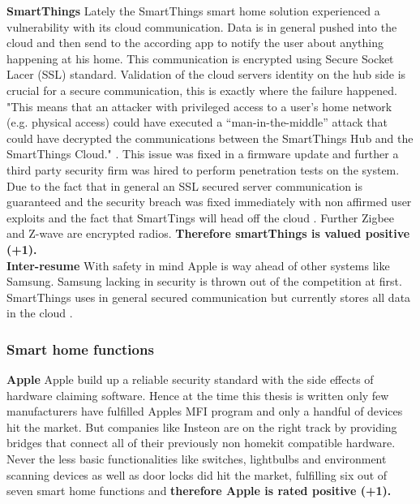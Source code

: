 			\textbf{SmartThings}
				Lately the SmartThings smart home solution experienced a vulnerability with its cloud communication. Data is in general pushed into the cloud and then send to the according app to notify the user about anything happening at his home. This communication is encrypted using Secure Socket Lacer (SSL) standard. Validation of the cloud servers identity on the hub side is crucial for a secure communication, this is exactly where the failure happened. "This means that an attacker with privileged access to a user’s home network (e.g. physical access) could have executed a “man-in-the-middle” attack that could have decrypted the communications between the SmartThings Hub and the SmartThings Cloud." \parencite{SmartThingsSecurityIssue}. This issue was fixed in a firmware update and further a third party security firm was hired to perform penetration tests on the system. Due to the fact that in general an SSL secured server communication is guaranteed and the security breach was fixed immediately with non affirmed user exploits and the fact that SmartTings will head off the cloud \parencite{SmartThingsCloud}. Further Zigbee and Z-wave are encrypted radios. \textbf{Therefore smartThings is valued positive (+1).}\\
				
			\textbf{Inter-resume}
				With safety in mind Apple is way ahead of other systems like Samsung. Samsung lacking in security is thrown out of the competition at first. SmartThings uses in general secured communication but currently stores all data in the cloud \parencite{SmartThingsCloud}.
	
				\pagebreak

		\subsubsection{Smart home functions}
			\textbf{Apple}
				Apple build up a reliable security standard with the side effects of hardware claiming software. Hence at the time this thesis is written only few manufacturers have fulfilled Apples MFI program and only a handful of devices hit the market. But companies like Insteon are on the right track by providing bridges that connect all of their previously non homekit compatible hardware. Never the less basic functionalities like switches, lightbulbs and environment scanning devices as well as door locks did hit the market, fulfilling six out of seven smart home functions and \textbf{therefore Apple is rated positive (+1).}\\

